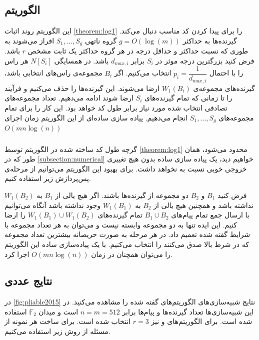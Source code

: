 \subsection{الگوریتم }
این الگوریتم روند اثبات
\autoref{theorem:log1}
را برای پیدا کردن کد مناسب دنبال می‌کند. گیرنده‌ها به حداکثر
$g = O(\log(m))$
گروه ناتهی
$S_1, \ldots, S_g$
افراز می‌شوند به طوری که نسبت حداکثر و حداقل درجه در هر گروه حداکثر یک ثابت مشخص
$r$
باشد. فرض کنید بزرگترین درجه موثر در
$S_i$
برابر
$d_{max, i}$
باشد. در همسایگی
$N[S_i]$
هر راس را با احتمال
$p_i = \dfrac{1}{d_{max, i}}$
 انتخاب می‌کنیم.
 اگر
 $B_i$
 مجموعه‌ی راس‌های انتخابی باشد،
 گیرنده‌های مجموعه‌ی
 $W_1(B_i)$
 ارضا می‌شوند. این گیرنده‌ها را حذف می‌کنیم و فرآیند را تا زمانی که تمام گیرنده‌های
 $S_i$
 ارضا شوند ادامه می‌دهیم. تعداد مجموعه‌های تصادفی انتخاب شده مورد نیاز برابر طول کد خواهد بود. این کار را برای تمام مجموعه‌های
 $S_1, \ldots, S_g$
 انجام می‌دهیم. پیاده سازی ساده‌ای از این الگوریتم زمان اجرای
 $O(m n \log(n))$
 
 \subsubsection{}
 گرچه طول کد ساخته شده در الگوریتم
 توسط
 \autoref{theorem:log1}
 محدود می‌شود، همان طور که در 
 \autoref{subsection:numerical}
  خواهیم دید، یک پیاده سازی ساده بدون هیچ تغییری خروجی خوبی نسبت به
  نخواهد داشت. برای بهبود این الگوریتم می‌توانیم از مرحله‌ی پس‌پردازش زیر استفاده کنیم.
  
  فرض کنید
  $B_1$
  و
  $B_2$
  دو مجموعه از گیرنده‌ها باشند. اگر هیچ یالی از
  $B_1$
  به
  $W_1(B_2)$
  نداشته باشد و همچنین هیچ یالی از
  $B_2$
  به
  $W_1(B_1)$
  وجود نداشته باشد آنگاه می‌توانیم با ارسال جمع تمام پیام‌های
  $B_1 \cup B_2$
  تمام گیرنده‌های
  $W_1(B_1) \cup W_1(B_2)$
  را ارضا کنیم. این ایده تنها به دو مجموعه وابسته نیست و می‌توان به هر تعداد مجموعه با شرایط گفته شده تعمیم داد. در هر مرحله به صورت حریصانه بیشترین تعداد مجموعه که در شرط بالا صدق می‌کنند را انتخاب می‌کنیم. با یک پیاده‌سازی ساده این الگوریتم را می‌توان همچنان در زمان
  $O(m n \log(n))$
  اجرا کرد.
  \subsection{
  نتایج عددی
  }
  \label{subsection:numerical}
  در
  \autoref{fig:pliable2015}
  نتایج شبیه‌سازی‌های الگوریتم‌های گفته شده را مشاهده می‌کنید. در این شبیه‌سازی‌ها تعداد گیرنده‌ها و پیام‌ها برابر
  $n = m = 512$
  است و میدان
  $\mathbb{F}_2$
  استفاده شده است. برای الگوریتم‌های
  و
  نیز
  $r = 3$
  انتخاب شده است. برای ساخت هر نمونه از مسئله از روش زیر استفاده می‌کنیم.
  
